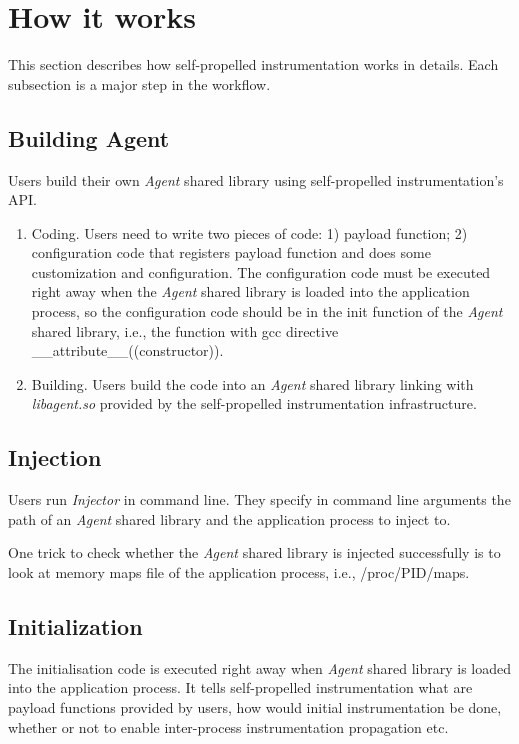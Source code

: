 \section{How it works}
This section describes how self-propelled instrumentation works in details.
Each subsection is a major step in the workflow.

\subsection{Building Agent}
Users build their own {\em Agent} shared library using self-propelled
instrumentation's API.
\begin{enumerate}
\item Coding. Users need to write two pieces of code: 1) payload function; 2)
  configuration code that registers payload function and does some customization
  and configuration. The configuration code must be executed right away when the
  {\em Agent} shared library is loaded into the application process, so the
  configuration code should be in the init function of the {\em Agent} shared
  library, i.e., the function with gcc directive
  \_\_attribute\_\_((constructor)).
\item Building. Users build the code into an {\em Agent} shared library linking
  with {\em libagent.so} provided by the self-propelled instrumentation
  infrastructure.
\end{enumerate}

\subsection{Injection}
Users run {\em Injector} in command line. They specify in command line arguments
the path of an {\em Agent} shared library and the application process to inject
to.

One trick to check whether the {\em Agent} shared library is injected
successfully is to look at memory maps file of the application process, i.e.,
/proc/PID/maps.

\subsection{Initialization} %

The initialisation code is executed right away when {\em Agent} shared library
is loaded into the application process.
It tells self-propelled instrumentation what are payload functions provided by
users, how would initial instrumentation be done, whether or not to enable
inter-process instrumentation propagation etc.

